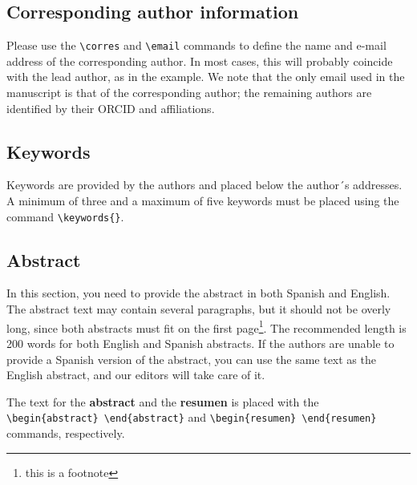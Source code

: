 \documentclass[9pt,twoside]{rmaa-rho-class/rmaa-rho_light}
\newcommand{\CS}[1]{\texttt{\textbackslash #1}}
\begin{document}
    \subsection{Corresponding author information}
    
        Please use the \CS{corres} and \CS{email} commands to define the name and e-mail address of the corresponding author. In most cases, this will probably coincide with the lead author, as in the example. We note that the only email used in the manuscript is that of the corresponding author; the remaining authors are identified by their ORCID and affiliations.

        \subsection{Keywords}

        Keywords are provided by the authors and placed below the author´s addresses. A minimum of three and a maximum of five keywords must be placed using the command \verb|\keywords{}|.
    
    \subsection{Abstract}
    
        In this section, you need to provide the abstract in both Spanish and English. The abstract text may contain several paragraphs, but it should not be overly long, since both abstracts must fit on the first page\footnote{this is a footnote}. The recommended length is 200 words for both English and Spanish abstracts. If the authors are unable to provide a Spanish version of the abstract, you can use the same text as the English abstract, and our editors will take care of it.
    
        The text for the {\bf abstract} and the {\bf resumen} is placed with the \verb|\begin{abstract} \end{abstract}| and \verb|\begin{resumen} \end{resumen}| commands, respectively. 
        
\end{document}
